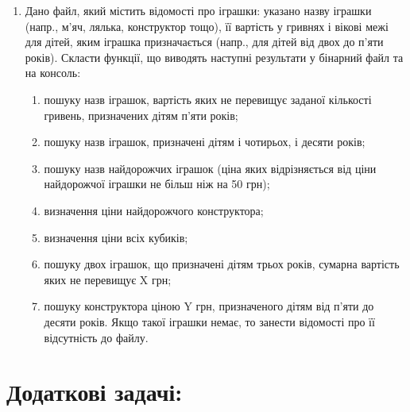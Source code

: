 \documentclass[a5paper,titlepage,openany,twoside,draft]{book_unv}%
\makeatletter
\newcommand{\xslalph}[1]{\expandafter\@xslalph\csname c@#1\endcsname}
\newcommand{\@xslalph}[1]{%
    \ifcase#1\or а\or б\or в\or г\or д\or e\or є\or ж\or з\or i%
    \or й\or к\or л\or м\or н\or о\or п\or р\or с\or т%
    \or у\or ф\or х\or ц\or ч\or ш\or ю\or я\or аа\or бб\or вв%
    \else\@ctrerr\fi%
}
\makeatother
\begin{document}
\begin{enumerate}
\item
  Дано файл, який містить відомості про іграшки: указано назву іграшки
  (напр., м'яч, лялька, конструктор тощо), її вартість у гривнях і
  вікові межі для дітей, яким іграшка призначається (напр., для дітей
  від двох до п'яти років). Скласти функції, що виводять наступні результати 
  у бінарний файл та на консоль:

  \begin{enumerate}[label=\xslalph*)]
\item
пошуку назв іграшок, вартість яких не перевищує заданої кількості гривень,
 призначених дітям п'яти років;
\item
пошуку назв іграшок, призначені дітям і чотирьох, і десяти років;
\item
пошуку назв найдорожчих іграшок (ціна яких відрізняється від ціни
найдорожчої іграшки не більш ніж на 50 грн);
\item визначення ціни найдорожчого конструктора;
\item визначення ціни всіх кубиків;
\item пошуку двох іграшок, що призначені дітям трьох років, сумарна
вартість яких не перевищує X грн;
\item
пошуку конструктора ціною Y грн, призначеного дітям від п'яти до
десяти років. Якщо такої іграшки немає, то занести відомості про її
відсутність до файлу.
  \end{enumerate} 


\end{enumerate}

\section{Додаткові задачі:}
\end{document}
